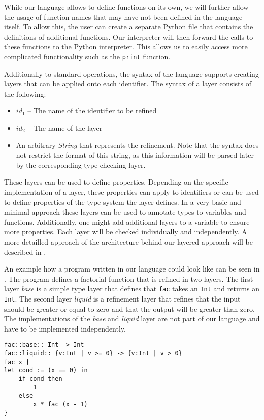 While our language allows to define functions on its own, we will further allow the usage of function names that may have not been defined in the language itself. To allow this, the user can create a separate Python file that contains the definitions of additional functions. Our interpreter will then forward the calls to these functions to the Python interpreter. This allows us to easily access more complicated functionality such as the \texttt{print} function.

Additionally to standard operations, the syntax of the language supports creating layers that can be applied onto each identifier. The syntax of a layer consists of the following:
\begin{itemize}
	\item $id_1$ -- The name of the identifier to be refined
	\item $id_2$ -- The name of the layer
	\item An arbitrary \textit{String} that represents the refinement. Note that the syntax does not restrict the format of this string, as this information will be parsed later by the corresponding type checking layer.
\end{itemize}

These layers can be used to define properties. Depending on the specific implementation of a layer, these properties can apply to identifiers or can be used to define properties of the type system the layer defines. In a very basic and minimal approach these layers can be used to annotate types to variables and functions. Additionally, one might add additional layers to a variable to ensure more properties. Each layer will be checked individually and independently. A more detailled approach of the architecture behind our layered approach will be described in .

An example how a program written in our language could look like can be seen in . The program defines a factorial function that is refined in two layers. The first layer \textit{base} is a simple type layer that defines that \texttt{fac} takes an \texttt{Int} and returns an \texttt{Int}. The second layer \textit{liquid} is a refinement layer that refines that the input should be greater or equal to zero and that the output will be greater than zero. The implementations of the \textit{base} and \textit{liquid} layer are not part of our language and have to be implemented independently.

\begin{lstlisting}[caption={Example of a factorial function in our simple language}, label={lst:fac_example}]
fac::base:: Int -> Int
fac::liquid:: {v:Int | v >= 0} -> {v:Int | v > 0}
fac x { 
let cond := (x == 0) in
	if cond then 
		1 
	else 
		x * fac (x - 1) 
}
\end{lstlisting}

